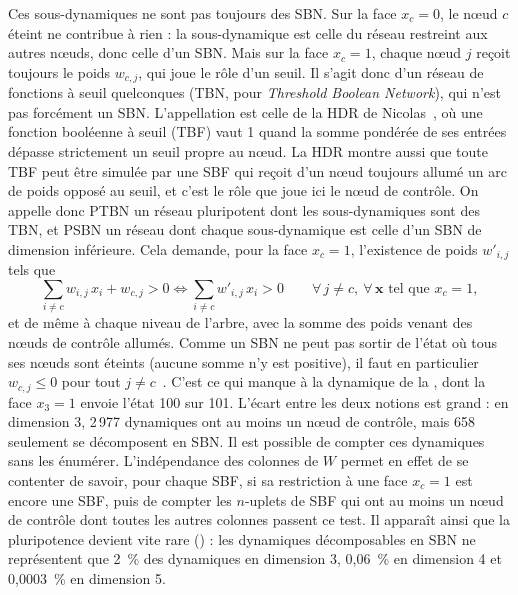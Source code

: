 \documentclass[12pt, a4paper]{article}
\begin{document}
Ces sous-dynamiques ne sont pas toujours des SBN.
Sur la face $x_c = 0$, le nœud $c$ éteint ne contribue à rien : la sous-dynamique est celle du réseau restreint aux autres nœuds, donc celle d'un SBN.
Mais sur la face $x_c = 1$, chaque nœud $j$ reçoit toujours le poids $w_{c,j}$, qui joue le rôle d'un seuil.
Il s'agit donc d'un réseau de fonctions à seuil quelconques (TBN, pour \emph{Threshold Boolean Network}), qui n'est pas forcément un SBN.
L'appellation est celle de la HDR de Nicolas~\cite{glade2022}, où une fonction booléenne à seuil (TBF) vaut 1 quand la somme pondérée de ses entrées dépasse strictement un seuil propre au nœud.
La HDR montre aussi que toute TBF peut être simulée par une SBF qui reçoit d'un nœud toujours allumé un arc de poids opposé au seuil, et c'est le rôle que joue ici le nœud de contrôle.
On appelle donc PTBN un réseau pluripotent dont les sous-dynamiques sont des TBN, et PSBN un réseau dont chaque sous-dynamique est celle d'un SBN de dimension inférieure.
Cela demande, pour la face $x_c = 1$, l'existence de poids $w'_{i,j}$ tels que
\begin{equation}
\sum_{i \neq c} w_{i,j}\, x_i + w_{c,j} > 0
\iff
\sum_{i \neq c} w'_{i,j}\, x_i > 0
\qquad \forall\, j \neq c,\ \forall\, \mathbf{x} \text{ tel que } x_c = 1 ,
\end{equation}
et de même à chaque niveau de l'arbre, avec la somme des poids venant des nœuds de contrôle allumés.
Comme un SBN ne peut pas sortir de l'état où tous ses nœuds sont éteints (aucune somme n'y est positive), il faut en particulier $w_{c,j} \le 0$ pour tout $j \neq c$~\cite{wu2024}.
C'est ce qui manque à la dynamique de la , dont la face $x_3 = 1$ envoie l'état 100 sur 101.
L'écart entre les deux notions est grand : en dimension 3, 2\,977 dynamiques ont au moins un nœud de contrôle, mais 658 seulement se décomposent en SBN.
Il est possible de compter ces dynamiques sans les énumérer.
L'indépendance des colonnes de $W$ permet en effet de se contenter de savoir, pour chaque SBF, si sa restriction à une face $x_c = 1$ est encore une SBF, puis de compter les $n$-uplets de SBF qui ont au moins un nœud de contrôle dont toutes les autres colonnes passent ce test.
Il apparaît ainsi que la pluripotence devient vite rare () : les dynamiques décomposables en SBN ne représentent que 2~\% des dynamiques en dimension 3, 0,06~\% en dimension 4 et 0,0003~\% en dimension 5.
\end{document}
